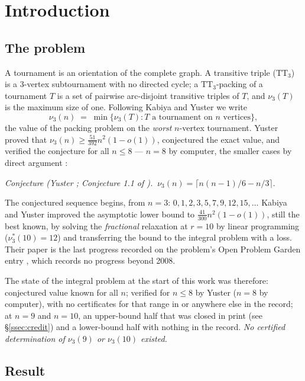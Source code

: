 \documentclass[11pt]{amsart}
\newcommand{\TT}{\mathrm{TT}_3}
\newcommand{\nut}{\nu_3}
\newcommand{\nuf}{\nu_3^{*}}
\theoremstyle{plain}
\theoremstyle{definition}
\theoremstyle{remark}
\begin{document}
\section{Introduction}\label{sec:intro}

\subsection{The problem}
A tournament is an orientation of the complete graph. A transitive triple
($\TT$) is a $3$-vertex subtournament with no directed cycle; a
$\TT$-packing of a tournament $T$ is a set of pairwise arc-disjoint
transitive triples of $T$, and $\nut(T)$ is the maximum size of one.
Following Kabiya and Yuster \cite{KY08} we write
\[
\nut(n)\;=\;\min\{\nut(T): T \text{ a tournament on } n
\text{ vertices}\},
\]
the value of the packing problem on the \emph{worst} $n$-vertex
tournament. Yuster \cite{Yuster04} proved that
$\nut(n)\ge\frac{51}{392}n^{2}(1-o(1))$, conjectured the exact value, and
verified the conjecture for all $n\le 8$ --- $n=8$ by computer, the
smaller cases by direct argument \cite[\S4]{Yuster04}:

\begin{center}
\emph{Conjecture (Yuster \cite{Yuster04}; Conjecture 1.1 of
\cite{KY08}).} $\ \nut(n)=\lceil n(n-1)/6-n/3\rceil$.
\end{center}

\noindent The conjectured sequence begins, from $n=3$:
$0,1,2,3,5,7,9,12,15,\dots$ Kabiya and Yuster \cite{KY08} improved the
asymptotic lower bound to $\frac{41}{300}n^{2}(1-o(1))$, still the best
known, by solving the \emph{fractional} relaxation at $r=10$ by linear
programming ($\nuf(10)=12$) and transferring the bound to the integral
problem with a loss. Their paper is the last progress recorded on the
problem's Open Problem Garden entry \cite{OPG}, which records no
progress beyond 2008.

The state of the integral problem at the start of this work was
therefore: conjectured value known for all $n$; verified for $n\le8$ by
Yuster ($n=8$ by computer), with no certificates for that range in
\cite{Yuster04} or anywhere else in the record; at $n=9$
and $n=10$, an upper-bound half that was closed in print (see
\S\ref{ssec:credit}) and a lower-bound half with nothing in the record.
\emph{No certified determination of $\nut(9)$ or $\nut(10)$ existed.}

\subsection{Result}
\end{document}
